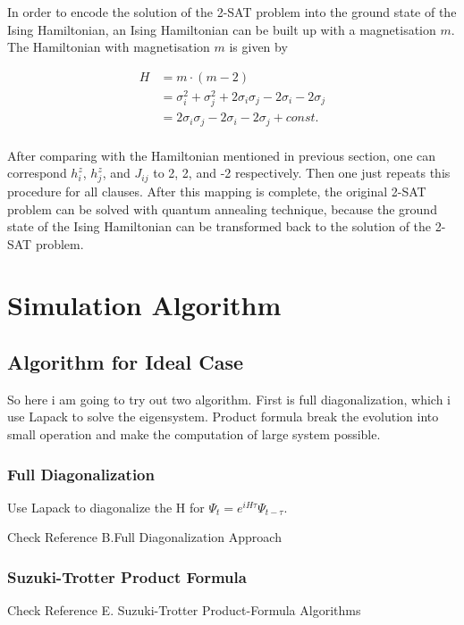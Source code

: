 \documentclass[twoside,a4paper,article]{combine}
\begin{document}
In order to encode the solution of the 2-SAT problem into the ground state of the Ising Hamiltonian, an Ising Hamiltonian can be built up with a magnetisation $m$. The Hamiltonian with magnetisation $m$ is given by 

\begin{equation}
\begin{split}
H & = m \cdot (m-2)\\
  & = \sigma_i^2 + \sigma_j^2 + 2\sigma_i \sigma_j -2\sigma_i -2\sigma_j\\
  & = 2\sigma_i \sigma_j -2\sigma_i -2\sigma_j + const.\\
\end{split}
\end{equation}

After comparing with the Hamiltonian mentioned in previous section, one can correspond $h_i^z$, $h_j^z$, and $J_{ij}$ to 2, 2, and -2 respectively. Then one just repeats this procedure for all clauses. After this mapping is complete, the original 2-SAT problem can be solved with quantum annealing technique, because the ground state of the Ising Hamiltonian can be transformed back to the solution of the 2-SAT problem. \\  







\section {Simulation Algorithm}
\subsection{Algorithm for Ideal Case}
So here i am going to try out two algorithm. First is full diagonalization, which i use Lapack to solve the eigensystem. Product formula break the evolution into small operation and make the computation of large system possible.
\subsubsection{Full Diagonalization}
Use Lapack to diagonalize the H for $\Psi_{t} = e^{iH\tau} \Psi_{t-\tau}$. 

Check Reference \cite{DeRaedt2004} B.Full Diagonalization Approach

\subsubsection{Suzuki-Trotter Product Formula}
Check Reference \cite{DeRaedt2004}  E. Suzuki-Trotter Product-Formula Algorithms
\end{document}
